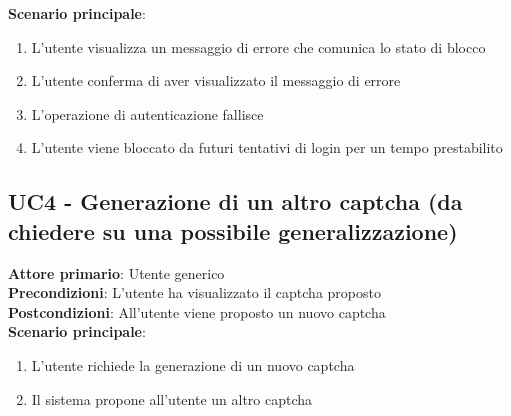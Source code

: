 \textbf{Scenario principale}:
\begin{enumerate}
   \item L'utente visualizza un messaggio di errore che comunica lo stato di blocco
   \item L'utente conferma di aver visualizzato il messaggio di errore
   \item L'operazione di autenticazione fallisce
   \item L'utente viene bloccato da futuri tentativi di login per un tempo prestabilito
\end{enumerate}

\subsection{UC4 - Generazione di un altro captcha (da chiedere su una possibile generalizzazione)}
\textbf{Attore primario}: Utente generico\\
\textbf{Precondizioni}: L'utente ha visualizzato il captcha proposto\\
\textbf{Postcondizioni}: All'utente viene proposto un nuovo captcha\\

\textbf{Scenario principale}:
\begin{enumerate}
   \item L'utente richiede la generazione di un nuovo captcha
   \item Il sistema propone all'utente un altro captcha
\end{enumerate}